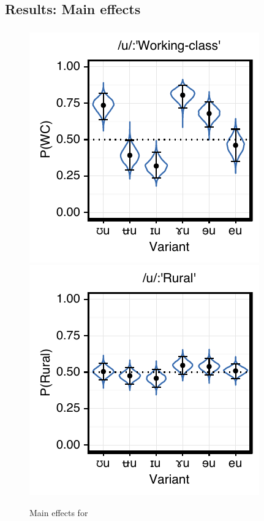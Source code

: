 \documentclass[PWPL]{article}
\begin{document}
\subsection{Results: Main effects}
\subsubsection{}
\begin{figure}[ht]
\centering
\caption{Main effects for }
\includegraphics[scale=0.65]{uw_class.pdf}
\includegraphics[scale=0.65]{uw_local.pdf}

\end{figure}
\end{document}
